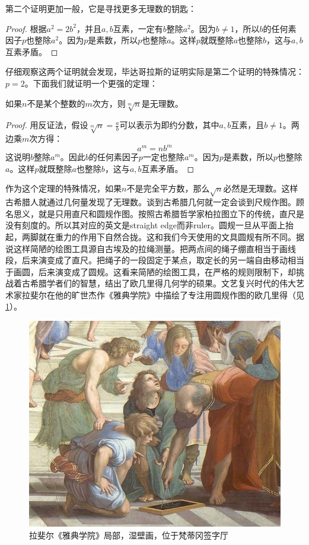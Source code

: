 \documentclass[b5paper]{ctexart}
\begin{document}
第二个证明更加一般，它是寻找更多无理数的钥匙：
\begin{proof}
根据$a^2 = 2b^2$，并且$a, b$互素，一定有$b$整除$a^2$。因为$b \ne 1$，所以$b$的任何素因子$p$也整除$a^2$。因为$p$是素数，所以$p$也整除$a$。这样$p$就既整除$a$也整除$b$，这与$a, b$互素矛盾。
\end{proof}

仔细观察这两个证明就会发现，毕达哥拉斯的证明实际是第二个证明的特殊情况：$p = 2$。下面我们就证明一个更强的定理：

\begin{theorem}
如果$n$不是某个整数的$m$次方，则$\sqrt[m]{n}$是无理数。
\end{theorem}

\begin{proof}
用反证法，假设$\sqrt[m]{n} = \frac{a}{b}$可以表示为即约分数，其中$a, b$互素，且$b \ne 1$。两边乘$m$次方得：
\[
a^m = n b^m
\]
这说明$b$整除$a^m$。因此$b$的任何素因子$p$一定也整除$a^m$。因为$p$是素数，所以$p$也整除$a$。这样$p$就既整除$a$也整除$b$，这与$a, b$互素矛盾。
\end{proof}

作为这个定理的特殊情况，如果$n$不是完全平方数，那么$\sqrt{n}$必然是无理数。这样古希腊人就通过几何量发现了无理数。谈到古希腊几何就一定会谈到尺规作图。顾名思义，就是只用直尺和圆规作图。按照古希腊哲学家柏拉图立下的传统，直尺是没有刻度的。所以其对应的英文是straight edge而非ruler。圆规一旦从平面上抬起，两脚就在重力的作用下自然合拢。这和我们今天使用的文具圆规有所不同。据说这样简陋的绘图工具源自古埃及的拉绳测量。把两点间的绳子绷直相当于画线段，后来演变成了直尺。把绳子的一段固定于某点，取定长的另一端自由移动相当于画圆，后来演变成了圆规。这看来简陋的绘图工具，在严格的规则限制下，却挑战着古希腊学者们的智慧，结出了欧几里得几何学的硕果。文艺复兴时代的伟大艺术家拉斐尔在他的旷世杰作《雅典学院》中描绘了专注用圆规作图的欧几里得（见\cref{fig:euclid-soa}）。

\begin{figure}[htbp]
 \centering
 \includegraphics[scale=0.35]{img/euclid-soa}
 \caption{拉斐尔《雅典学院》局部，湿壁画，位于梵蒂冈签字厅}
 \label{fig:euclid-soa}
\end{figure}
\end{document}
